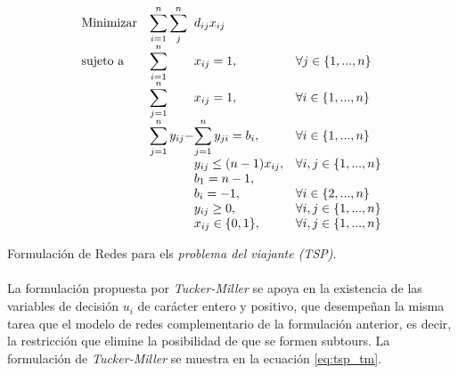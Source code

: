 \documentclass[spanish]{article}
\begin{document}
			\begin{eqfloat}
				\begin{equation}
					\begin{array}{ll@{}ll}
						\text{Minimizar}	& \displaystyle\sum\limits_{i = 1}^{n}\sum\limits_{j}^{n} & d_{ij}x_{ij} &\\
						\text{sujeto a}		& \displaystyle\sum\limits_{i = 1}^{n}	&	x_{ij} 	= 1,  & \forall j \in \{1,...,n\}\\
															& \displaystyle\sum\limits_{j = 1}^{n}	&	x_{ij} 	= 1,  & \forall i \in \{1,...,n\}\\
															& \displaystyle\sum\limits_{j = 1}^n	y_{ij} - &\displaystyle\sum\limits_{j = 1}^n	y_{ji} = b_{i},  & \forall i \in \{1,...,n\} \\
															&                               &	y_{ij}  \leq (n-1)x_{ij}, 	&  \forall i,j \in \{1,...,n\}\\
															&                               &	b_{1}  = n - 1, 	& \\
															&                               &	b_{i} = -1, 		& \forall i \in \{2,...,n\} \\
															&                               &	y_{ij} \geq 0, 		& \forall i,j \in \{1,...,n\} \\
															&                               &	x_{ij} \in \{0,1\}, 	& \forall i,j \in \{1,...,n\}
					\end{array}
				\end{equation}
				\caption{Formulación de Redes para els \emph{problema del viajante (TSP)}.}
				\label{eq:tsp_redes}
			\end{eqfloat}

			\paragraph{}
			La formulación propuesta por \emph{Tucker-Miller} se apoya en la existencia de las variables de decisión $u_i$ de carácter entero y positivo, que desempeñan la misma tarea que el modelo de redes complementario de la formulación anterior, es decir, la restricción que elimine la posibilidad de que se formen subtours. La formulación de \emph{Tucker-Miller} se muestra en la ecuación \eqref{eq:tsp_tm}.
\end{document}
